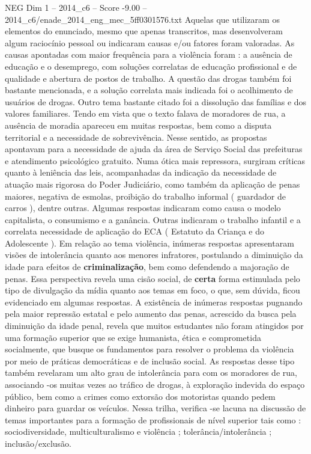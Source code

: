 \begin{textsample}{NEG Dim 1 – 2014\_c6 – Score -9.00 – 2014\_c6/enade\_2014\_eng\_mec\_5ff0301576.txt}
Aquelas que utilizaram os elementos do enunciado, mesmo que apenas transcritos, mas desenvolveram algum raciocínio pessoal ou indicaram causas e/ou fatores foram valoradas.
As causas apontadas com maior frequência para a violência foram : a ausência de educação e o desemprego, com soluções correlatas de educação profissional e de qualidade e abertura de postos de trabalho.
A questão das drogas também foi bastante mencionada, e a solução correlata mais indicada foi o acolhimento de usuários de drogas.
Outro tema bastante citado foi a dissolução das famílias e dos valores familiares.
Tendo em vista que o texto falava de moradores de rua, a ausência de moradia apareceu em muitas respostas, bem como a disputa territorial e a necessidade de sobrevivência.
Nesse sentido, as propostas apontavam para a necessidade de ajuda da área de Serviço Social das prefeituras e atendimento psicológico gratuito.
Numa ótica mais repressora, surgiram críticas quanto à leniência das leis, acompanhadas da indicação da necessidade de atuação mais rigorosa do Poder Judiciário, como também da aplicação de penas maiores, negativa de esmolas, proibição do trabalho informal ( guardador de carros ), dentre outras.
Algumas respostas indicaram como causa o modelo capitalista, o consumismo e a ganância.
Outras indicaram o trabalho infantil e a correlata necessidade de aplicação do ECA ( Estatuto da Criança e do Adolescente ).
Em relação ao tema violência, inúmeras respostas apresentaram visões de intolerância quanto aos menores infratores, postulando a diminuição da idade para efeitos de \textbf{criminalização}, bem como defendendo a majoração de penas.
Essa perspectiva revela uma cisão social, de \textbf{certa} forma estimulada pelo tipo de divulgação da mídia quanto aos temas em foco, o que, sem dúvida, ficou evidenciado em algumas respostas.
A existência de inúmeras respostas pugnando pela maior repressão estatal e pelo aumento das penas, acrescido da busca pela diminuição da idade penal, revela que muitos estudantes não foram atingidos por uma formação superior que se exige humanista, ética e comprometida socialmente, que busque os fundamentos para resolver o problema da violência por meio de práticas democráticas e de inclusão social.
As respostas desse tipo também revelaram um alto grau de intolerância para com os moradores de rua, associando -os muitas vezes ao tráfico de drogas, à exploração indevida do espaço público, bem como a crimes como extorsão dos motoristas quando pedem dinheiro para guardar os veículos.
Nessa trilha, verifica -se lacuna na discussão de temas importantes para a formação de profissionais de nível superior tais como : sociodiversidade, multiculturalismo e violência ; tolerância/intolerância ; inclusão/exclusão.

\end{textsample}
